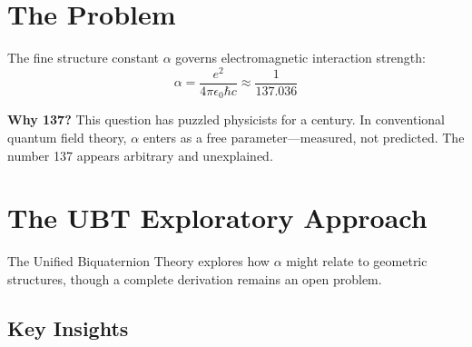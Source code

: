 \documentclass[12pt, a4paper]{article}
\begin{document}
\vspace{1em}

\begin{abstract}
\noindent\textcolor{ubtblue}{\textbf{Exploratory Investigation:}} The fine structure constant $\alpha \approx 1/137$ might emerge from geometric structures in the Unified Biquaternion Theory (UBT). We explore how complex time topology and gauge quantization could relate to $\alpha^{-1} \approx 137$, though this remains an open problem requiring further theoretical development. See disclaimer above for critical limitations.
\end{abstract}

\section{The Problem}

The fine structure constant $\alpha$ governs electromagnetic interaction strength:
\begin{equation}
\alpha = \frac{e^2}{4\pi\epsilon_0\hbar c} \approx \frac{1}{137.036}
\end{equation}

\textbf{Why 137?} This question has puzzled physicists for a century. In conventional quantum field theory, $\alpha$ enters as a free parameter—measured, not predicted. The number 137 appears arbitrary and unexplained.

\section{The UBT Exploratory Approach}

The Unified Biquaternion Theory explores how $\alpha$ might relate to geometric structures, though a complete derivation remains an open problem.

\subsection{Key Insights}
\end{document}
